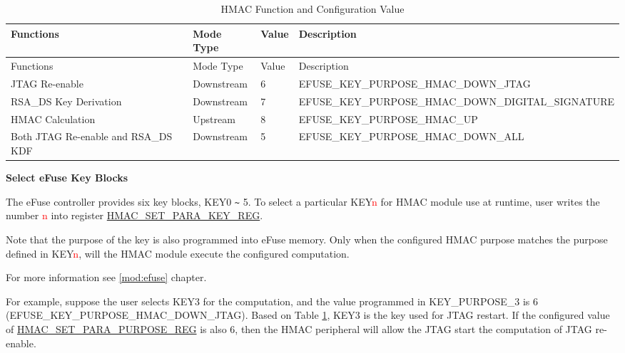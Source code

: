 \documentclass[main\_\_EN.tex]{subfiles}
\begin{document}
\begin{longtable}[c]{|p{3cm}|p{2cm}|p{1cm}|p{9.5cm}|}
\caption{HMAC Function and Configuration Value}
\label{table: HMAC_key_purpose}
\\    \hline
    \rowcolor{lightgray}
    Functions & Mode Type & Value & Description\\
    \hline
    \endfirsthead

    \hline
    \rowcolor{lightgray}
    Functions & Mode Type & Value & Description\\
    \hline
    \endhead

    \endfoot

    \hline
    \endlastfoot

    \hline
    JTAG Re-enable & Downstream & 6 & EFUSE\_KEY\_PURPOSE\_HMAC\_DOWN\_JTAG \\
    \hline
    RSA\_DS Key Derivation & Downstream & 7 & EFUSE\_KEY\_PURPOSE\_HMAC\_DOWN\_DIGITAL\_SIGNATURE \\
    \hline
    HMAC Calculation  & Upstream & 8 & EFUSE\_KEY\_PURPOSE\_HMAC\_UP \\
    \hline
    Both JTAG Re-enable and RSA\_DS KDF & Downstream & 5 & EFUSE\_KEY\_PURPOSE\_HMAC\_DOWN\_ALL \\
    \hline
\end{longtable}

\textbf{Select eFuse Key Blocks}
\label{hmac_config_efuse_key}

The eFuse controller provides six key blocks, KEY0 \verb+~+ 5. To select a particular KEY\textcolor{red}{n} for HMAC module use at runtime, user writes the number \textcolor{red}{n} into register \hyperref[regdesc:HMACSETPARAKEYREG]{HMAC\_SET\_PARA\_KEY\_REG}.

Note that the purpose of the key is also programmed into eFuse memory. Only when the configured HMAC purpose matches the purpose defined in KEY\textcolor{red}{n}, will the HMAC module execute the configured computation.

For more information see \ref{mod:efuse} chapter.

For example, suppose the user selects KEY3 for the computation, and the value programmed in KEY\_PURPOSE\_3 is 6 (EFUSE\_KEY\_PURPOSE\_HMAC\_DOWN\_JTAG). Based on Table \ref{table: HMAC_key_purpose}, KEY3 is the key used for JTAG restart. If the configured value of \hyperref[regdesc:HMACSETPARAPURPOSEREG]{HMAC\_SET\_PARA\_PURPOSE\_REG} is also 6, then the HMAC peripheral will allow the JTAG start the computation of JTAG re-enable.
\end{document}
